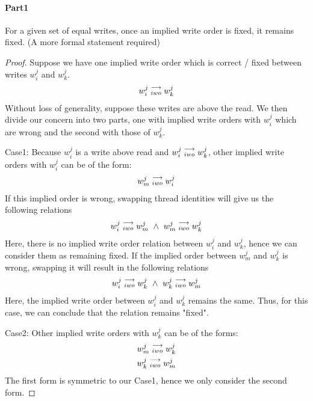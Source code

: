         \paragraph{Part1}
            For a given set of equal writes, once an implied write order is fixed, it remains fixed. 
            (A more formal statement required)
        \begin{proof}
            Suppose we have one implied write order which is correct / fixed between writes $w_i^j$ and $w_k^j$.
            \begin{align}
                w_i^j\stackrel{\longrightarrow}{_{iwo}}w_k^j
            \end{align}
            Without loss of generality, suppose these writes are above the read. We then divide our concern into two parts, one with implied write orders with $w_i^j$ which are wrong and the second with those of $w_k^j$.

            Case1: 
            Because $w_i^j$ is a write above read and $w_i^j\stackrel{\longrightarrow}{_{iwo}}w_k^j$, other implied write orders with $w_i^j$ can be of the form:
            \begin{align}
                w_m^j\stackrel{\longrightarrow}{_{iwo}}w_i^j
            \end{align}
            If this implied order is wrong, swapping thread identities will  give us the following relations 
            \begin{align}
                \reln{w_i^j}{iwo}{w_m^j} \ \wedge \ \reln{w_m^j}{iwo}{w_k^j}  
            \end{align}  
            Here, there is no implied write order relation between $w_i^j$ and $w_k^j$, hence we can consider them as remaining fixed. 
            If the implied order between $w_m^j$ and $w_k^j$ is wrong, swapping it will result in the following relations
            \begin{align}
                \reln{w_i^j}{iwo}{w_k^j} \ \wedge \ \reln{w_k^j}{iwo}{w_m^j}  
            \end{align}  
            Here, the implied write order between $w_i^j$ and $w_k^j$ remains the same. Thus, for this case, we can conclude that the relation remains "fixed".

            Case2: 
            Other implied write orders with $w_k^j$ can be of the forms:
            \begin{align}
                w_m^j\stackrel{\longrightarrow}{_{iwo}}w_k^j \\ 
                w_k^j\stackrel{\longrightarrow}{_{iwo}}w_m^j
            \end{align} 
            The first form is symmetric to our Case1, hence we only consider the second form. 


\end{proof}
